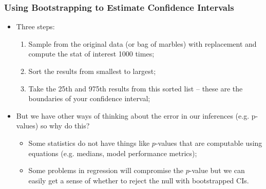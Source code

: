 \documentclass[aspectratio=169]{beamer}
\theoremstyle{principle}
\begin{document}
\begin{frame}
\frametitle{Using Bootstrapping to Estimate Confidence Intervals}

\begin{itemize}
\item Three steps:
\begin{enumerate}
\item Sample from the original data (or bag of marbles) with replacement and compute the stat of interest 1000 times;
\item Sort the results from smallest to largest; 
\item Take the 25th and 975th results from this sorted list -- these are the boundaries of your confidence interval;
\end{enumerate}
\bigskip

\item But we have other ways of thinking about the error in our inferences (e.g. p-values) so why do this?
\begin{itemize}
\item[]\color{white} Some statistics do not have things like $p$-values that are computable using equations (e.g. medians,  model performance metrics);
\item[]\color{white} Some problems in regression will compromise the $p$-value but we can easily get a sense of whether to reject the null with bootstrapped CIs.
\end{itemize}
\end{itemize}

\end{frame}
\end{document}
